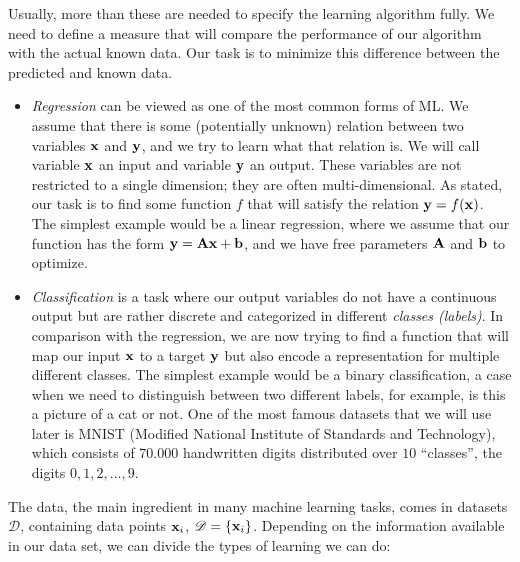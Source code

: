 Usually, more than these are needed to specify the learning algorithm fully. We need to define a measure that will compare the performance of our algorithm with the actual known data. Our task is to minimize this difference between the predicted and known data.
\par
\begin{itemize}
	\item \textit{Regression} can be viewed as one of the most common forms of ML. We assume that there is some (potentially unknown) relation between two variables $\vb{x}$ and $\vb{y}$, and we try to learn what that relation is. We will call variable $\vb{x}$ an input and variable $\vb{y}$ an output. These variables are not restricted to a single dimension; they are often multi-dimensional. As stated, our task is to find some function $f$ that will satisfy the relation $\vb{y}=f(\vb{x})$. The simplest example would be a linear regression, where we assume that our function has the form $\vb{y}=\vb{A}\vb{x} + \vb{b}$, and we have free parameters $\vb{A}$ and $\vb{b}$ to optimize.
	\item \textit{Classification} is a task where our output variables do not have a continuous output but are rather discrete and categorized in different \textit{classes (labels)}. In comparison with the regression, we are now trying to find a function that will map our input $\vb{x}$ to a target $\vb{y}$ but also encode a representation for multiple different classes. The simplest example would be a binary classification, a case when we need to distinguish between two different labels, for example, is this a picture of a cat or not. One of the most famous datasets that we will use later is MNIST (Modified National Institute of Standards and Technology), which consists of $70.000$ handwritten digits distributed over $10$ ``classes'', the digits $0, 1, 2, \dots, 9$. 
\end{itemize}
\par
The data, the main ingredient in many machine learning tasks, comes in datasets $\mathcal{D}$, containing data points $\vb{x}_i$, $\mathcal{D} = \{\vb{x}_i\}$. Depending on the information available in our data set, we can divide the types of learning we can do:
